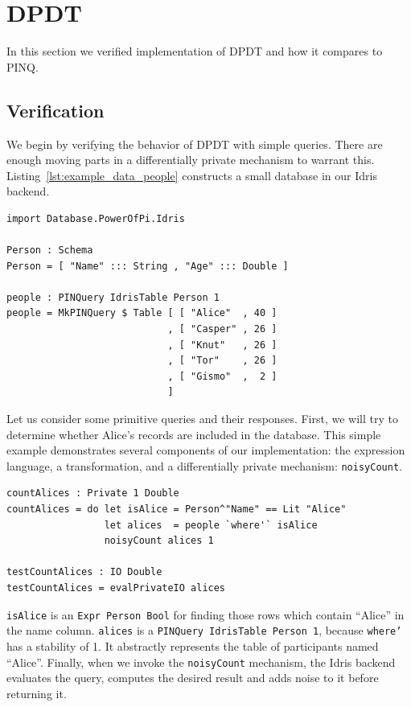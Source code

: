 \documentclass[12pt]{report}
\begin{document}
\section{DPDT}

In this section we verified implementation of DPDT and how it compares to PINQ.

\subsection{Verification}

We begin by verifying the behavior of DPDT with simple queries.
There are enough moving parts in a differentially private mechanism to warrant this.
Listing~\ref{lst:example_data_people} constructs a small database in our Idris backend.

\begin{lstlisting}[float,caption={Validation Data},label={lst:example_data_people}]
import Database.PowerOfPi.Idris

Person : Schema
Person = [ "Name" ::: String , "Age" ::: Double ]

people : PINQuery IdrisTable Person 1
people = MkPINQuery $ Table [ [ "Alice"  , 40 ]
                            , [ "Casper" , 26 ]
                            , [ "Knut"   , 26 ]
                            , [ "Tor"    , 26 ]
                            , [ "Gismo"  ,  2 ]
                            ]
\end{lstlisting}

Let us consider some primitive queries and their responses.
First, we will try to determine whether Alice's records are included in the database.
This simple example demonstrates several components of our implementation: the expression language, a transformation, and a differentially private mechanism: \texttt{noisyCount}.

\begin{lstlisting}[float,caption={Counting Alices},label={lst:counting_alices}]
countAlices : Private 1 Double
countAlices = do let isAlice = Person^"Name" == Lit "Alice"
                 let alices  = people `where'` isAlice
                 noisyCount alices 1

testCountAlices : IO Double
testCountAlices = evalPrivateIO alices
\end{lstlisting}

\texttt{isAlice} is an \texttt{Expr Person Bool} for finding those rows which contain ``Alice'' in the name column.
\texttt{alices} is a \texttt{PINQuery IdrisTable Person 1}, because \texttt{where'} has a stability of 1.
It abstractly represents the table of participants named ``Alice''.
Finally, when we invoke the \texttt{noisyCount} mechanism, the Idris backend evaluates the query, computes the desired result and adds noise to it before returning it.
\end{document}
